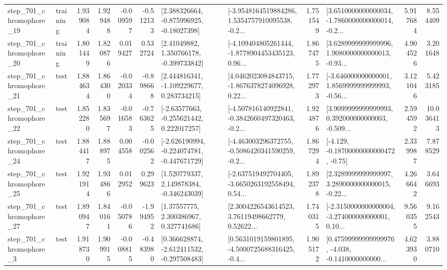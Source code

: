 \begin{tabular}{llrrrrllrlrr}
  step\_701\_chromophore\_19 &  training &      1.939084 &    1.929488 &     -0.009597 & -0.512133 &    [2.388326664, -0.875996925, -0.18027398] &  [-3.9548164519884286, 1.5354757910095538, -0.2... &       1.751549 &  [3.6510000000000034, -1.7860000000000014, -0.2... &            5.917684 &          8.554409 \\
  step\_701\_chromophore\_20 &  training &      1.801449 &    1.820876 &      0.019427 &  0.532724 &     [2.41049882, 1.350766178, -0.399733842] &  [-4.109404805261444, -1.8778904453435123, 0.96... &       1.867475 &  [3.6289999999999996, 1.9080000000000013, -0.93... &            4.904526 &          3.201648 \\
  step\_701\_chromophore\_21 &      test &      1.884634 &    1.864300 &     -0.020334 & -0.898668 &    [2.444816341, -1.109229677, 0.283734215] &  [4.0462023084843715, -1.8676378274096928, 0.22... &       1.772973 &  [-3.646000000000001, 1.8569999999999993, -0.56... &            3.121046 &          5.423185 \\
  step\_701\_chromophore\_22 &      test &      1.852280 &    1.835697 &     -0.016583 & -0.763625 &    [-2.63577663, -0.255621442, 0.222017257] &  [-4.507816140922841, -0.3842660497320463, -0.2... &       1.924876 &  [3.9099999999999993, 0.392000000000003, -0.509... &            2.594592 &         10.036413 \\
  step\_701\_chromophore\_24 &      test &      1.884417 &    1.888975 &      0.004558 & -0.002562 &  [-2.626190994, -0.224074781, -0.447671729] &  [-4.463003296372755, -0.5086420341590259, -0.2... &       1.867294 &              [-4.129, -0.18700000000000472, -0.75] &            2.339987 &          7.878529 \\
  step\_701\_chromophore\_25 &      test &      1.921914 &    1.934866 &      0.012952 &  0.299623 &    [1.520779337, 2.149878384, -0.346243039] &  [-2.637519492704405, -3.6650263192558494, 0.54... &       1.892378 &  [2.3289999999999997, 3.2890000000000015, -0.22... &            4.266642 &          3.646693 \\
  step\_701\_chromophore\_27 &      test &      1.890947 &    1.840161 &     -0.050786 & -1.994952 &      [1.37557775, 2.300386967, 0.327741686] &  [2.3004226543614523, 3.76119498662779, 0.52622... &       1.740315 &  [-2.3150000000000004, -3.274000000000001, 0.10... &            9.560355 &          9.162543 \\
   step\_701\_chromophore\_3 &      test &      1.918730 &    1.909915 &     -0.008815 & -0.483980 &   [0.366628874, -2.612411532, -0.297508483] &  [0.5631019159801895, -4.5000725688316425, -0.4... &       1.905172 &  [0.47599999999999976, -4.038, -0.1410000000000... &            4.623930 &          3.880710 \\

\end{tabular}
